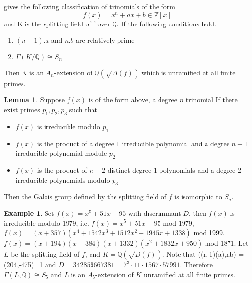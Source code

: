 \documentclass[12pt]{extarticle}
\newcommand{\Q}{\mathbb{Q}}
\newcommand{\<}{\langle}
\renewcommand{\>}{\rangle}
\theoremstyle{definition}
\newtheorem*{example}{Example}
\newtheorem{lemma}{Lemma}
\begin{document}
\cite{YAMA1970} gives the following classification of trinomials of the form 
\begin{equation}
    f(x) = x^n+ax+b \in \mathbb{Z}[x]
\end{equation}and K is the splitting field of f over $\Q$.
If the following conditions hold:
\begin{enumerate}
    \item $(n-1).a$ and $n.b$ are relatively prime 
    \item $\Gamma(K/\mathbb{Q}) \cong S_n$
\end{enumerate}\par
Then K is an $A_n$-extension of $\Q\left( \sqrt{\Delta(f)}\right)$ which is unramified at all finite primes.
\begin{lemma}
Suppose $f(x)$ is of the form above, a degree $n$ trinomial If there exist primes $p_1,p_2,p_3$ such that \begin{itemize}
\item $f(x)$ is irreducible modulo $p_1$
\item $f(x)$ is the product of a degree 1 irreducible polynomial and a degree $n-1$ irreducible polynomial module $p_2$
\item $f(x)$ is the product of $n-2$ distinct degree 1 polynomials and a degree 2 irreducible polynomials modulo $p_3$
\end{itemize}
Then the Galois group defined by the splitting field of $f$ is isomorphic to $S_n$.
\end{lemma}
\begin{example}
Set $f(x)= x^5+51x-95$ with discriminant $D$, then $f(x)$ is irreducible modulo 1979, i.e. $f(x)= x^5+51x-95 $ mod 1979, 
$f(x)=(x + 357)(x^4 + 1642x^3 + 1512 x^2 + 1945x + 1338)$ mod 1999, $f(x)=(
x + 194)(x + 384)(x + 1332)(x^2 + 1832x + 950)$ mod 1871. Let $L$ be the splitting field of $f$, and $K = \Q(\sqrt{D(f)})$.    
Note that ((n-1)(a),nb) = (204,-475)=1 and $D = 342859667381 = 7^3 \cdot 11 \cdot 1567 \cdot 57991$. Therefore $\Gamma(L,\Q) \cong S_5$ and $L$ is an $A_5$-extension of $K$ unramified at all finite primes.
\end{example}

\end{document}
